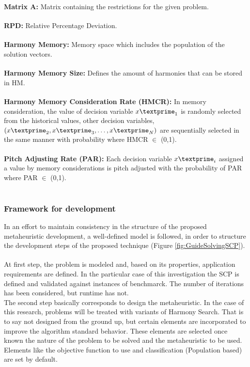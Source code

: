 \textbf{Matrix A:} 
Matrix containing the restrictions for the given problem.\\~\\

\textbf{RPD:} 
Relative Percentage Deviation.\\~\\

\textbf{Harmony Memory:} 
Memory space which includes the population of the solution vectors.\\~\\

\textbf{Harmony Memory Size:} 
Defines the amount of harmonies that can be stored in HM.\\~\\

\textbf{Harmony Memory Consideration Rate (HMCR):} 
In memory consideration, the value of decision variable ${x\textprime}_1$ is randomly selected from the historical values, other decision variables, $({x\textprime}_2, {x\textprime}_3,\dots,{x\textprime}_N)$ are sequentially selected in the same manner with probability where HMCR $\in$ (0,1).\\~\\

\textbf{Pitch Adjusting Rate (PAR):} 
Each decision variable ${x\textprime}_i$ assigned a value by memory considerations is pitch adjusted with the probability of PAR where PAR $\in$ (0,1).\\~\\

\subsubsection{Framework for development}
In an effort to maintain consistency in the structure of the proposed metaheuristic development, a well-defined model is followed, in order to structure the development steps of the proposed technique (Figure \ref{fig:GuideSolvingSCP}). \\
~\\
At first step, the problem is modeled and, based on its properties, application requirements are defined. In the particular case of this investigation the SCP is defined and validated against instances of benchmarck. The number of iterations has been considered, but runtime has not.\\

The second step basically corresponds to design the metaheuristic. In the case of this research, problems will be treated with variants of Harmony Search. That is to say not designed from the ground up, but certain elements are incorporated to improve the algorithm standard behavior. These elements are selected once known the nature of the problem to be solved and the metaheuristic to be used. Elements like the objective function to use and classification (Population based) are set by default.\\

